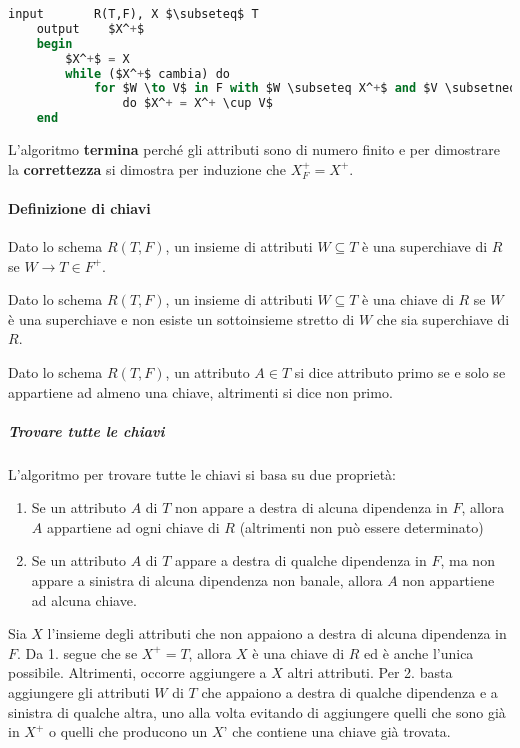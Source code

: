 \begin{lstlisting}[language=SQL, mathescape]
	input		R(T,F), X $\subseteq$ T
	output	  $X^+$
	begin
		$X^+$ = X
		while ($X^+$ cambia) do
			for $W \to V$ in F with $W \subseteq X^+$ and $V \subsetneq X^+$
				do $X^+ = X^+ \cup V$
	end
\end{lstlisting}
L'algoritmo \textbf{termina} perché gli attributi sono di numero finito e per dimostrare la \textbf{correttezza} si dimostra per induzione che $X_F^+ = X^+$.

\paragraph{Definizione di chiavi}
\begin{definition}[Superchiave]
	Dato lo schema $R(T, F)$, un insieme di attributi $W \subseteq T$ è	una superchiave di $R$ se $W \to T \in F^+$.
\end{definition}

\begin{definition}[Chiave]
	Dato lo schema $R(T, F)$, un insieme di attributi $W \subseteq T$ è	una chiave di $R$ se $W$ è una superchiave e non esiste un sottoinsieme stretto di $W$ che sia superchiave di $R$.
\end{definition}

\begin{definition}
	Dato lo schema $R(T, F)$, un attributo $A \in T$ si dice attributo primo se e solo se appartiene ad almeno una chiave, altrimenti si dice non primo.
\end{definition}

\subparagraph{Trovare tutte le chiavi}
L’algoritmo per trovare tutte le chiavi si basa su due proprietà:
\begin{enumerate}
	\item Se un attributo $A$ di $T$ non appare a destra di alcuna dipendenza in $F$, allora $A$ appartiene ad ogni chiave di $R$ (altrimenti non può essere determinato)
	\item Se un attributo $A$ di $T$ appare a destra di qualche dipendenza in $F$, ma non appare a sinistra di alcuna dipendenza non banale, allora $A$ non appartiene ad alcuna chiave.
\end{enumerate}

Sia $X$ l’insieme degli attributi che non appaiono a destra di alcuna dipendenza in $F$. Da 1. segue che se $X^+ = T$, allora $X$ è una chiave di $R$ ed è anche l’unica possibile. Altrimenti, occorre aggiungere a $X$ altri attributi. Per 2. basta aggiungere gli attributi $W$ di $T$ che appaiono a destra di qualche dipendenza e a sinistra di qualche altra, uno alla volta evitando di aggiungere quelli che sono già in $X^+$ o quelli che producono un $X’$ che contiene una chiave già trovata.


